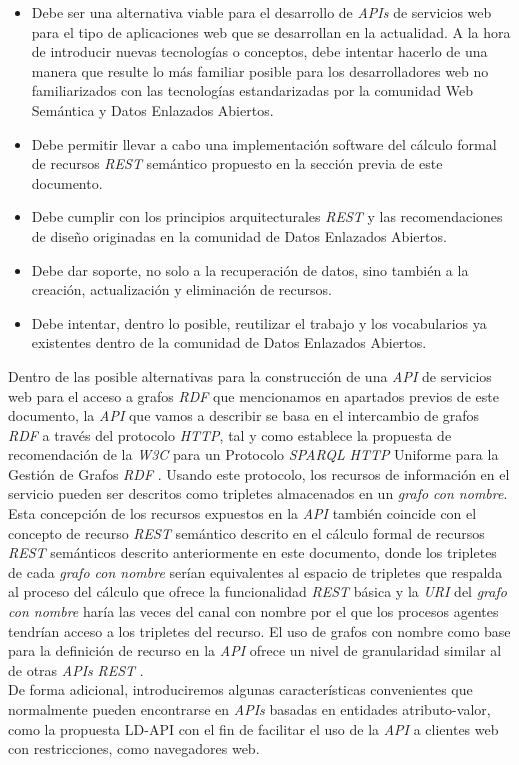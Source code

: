 \begin{itemize}
\item Debe ser una alternativa viable para el desarrollo de \textit{APIs} de servicios web para el tipo de aplicaciones web que se desarrollan en la actualidad. A la hora de introducir nuevas tecnolog\'ias o conceptos, debe intentar hacerlo de una manera que resulte lo m\'as familiar posible para los desarrolladores web no familiarizados con las tecnolog\'ias estandarizadas por la comunidad Web Sem\'antica y Datos Enlazados Abiertos.
\item Debe permitir llevar a cabo una implementaci\'on software del c\'alculo formal de recursos \textit{REST} sem\'antico propuesto en la secci\'on previa de este documento.
\item Debe cumplir con los principios arquitecturales \textit{REST} y las recomendaciones de dise\~no originadas en la comunidad de Datos Enlazados Abiertos.
\item Debe dar soporte, no solo a la recuperaci\'on de datos, sino tambi\'en a la creaci\'on, actualizaci\'on y eliminaci\'on de recursos.
\item Debe intentar, dentro lo posible, reutilizar el trabajo y los vocabularios ya existentes dentro de la comunidad de Datos Enlazados Abiertos.
\end{itemize}

Dentro de las posible alternativas para la construcci\'on de una \textit{API} de servicios web para el acceso a grafos \textit{RDF} que mencionamos en apartados previos de este documento, la \textit{API} que vamos a describir se basa en el intercambio de grafos \textit{RDF} a trav\'es del protocolo \textit{HTTP}, tal y como establece la propuesta de recomendaci\'on de la \textit{W3C} para un  Protocolo \textit{SPARQL} \textit{HTTP} Uniforme para la Gesti\'on de Grafos \textit{RDF} \cite{ogbuji2011sparql}. Usando este protocolo, los recursos de informaci\'on en el servicio pueden ser descritos como tripletes almacenados en un \textit{grafo con nombre}. Esta concepci\'on de los recursos expuestos en la \textit{API} tambi\'en coincide con el concepto de recurso \textit{REST} sem\'antico descrito en el c\'alculo formal de recursos \textit{REST} sem\'anticos descrito anteriormente en este documento, donde  los tripletes de cada \textit{grafo con nombre} ser\'ian equivalentes al espacio de tripletes que respalda al proceso del c\'alculo que ofrece la funcionalidad \textit{REST} b\'asica y la \textit{URI} del \textit{grafo con nombre} har\'ia las veces del canal con nombre por el que los procesos agentes tendr\'ian acceso a los tripletes del recurso.
El uso de grafos con nombre como base para la definici\'on de recurso en la \textit{API} ofrece un nivel de granularidad similar al de otras \textit{APIs} \textit{REST} \cite{wilde2009restful}.\\
De forma adicional, introduciremos algunas caracter\'isticas convenientes que normalmente pueden encontrarse en \textit{APIs} basadas en entidades atributo-valor, como la propuesta LD-API \cite{ld_api} con el fin de facilitar el uso de la \textit{API} a clientes web con restricciones, como navegadores web.


